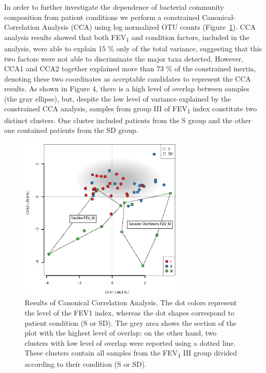 In order to further investigate the dependence of bacterial community composition from patient conditions we perform a constrained Canonical-Correlation Analysis (CCA) using log normalized OTU counts (Figure~\ref{fig:fig416s}). CCA analysis results showed that both FEV\textsubscript{1} and condition factors, included in the analysis, were able to explain 15 \% only of the total variance, suggesting that this two factors were not able to discriminate the major taxa detected. However, CCA1 and CCA2 together explained more than 73 \% of the constrained inertia, denoting these two coordinates as acceptable candidates to represent the CCA results. As shown in Figure 4, there is a high level of overlap between samples (the gray ellipse), but, despite the low level of variance explained by the constrained CCA analysis, samples from group III of FEV\textsubscript{1} index constitute two distinct clusters. One cluster included patients from the S group and the other one contained patients from the SD group.\\%
\begin{figure}[!tb]
	\centering
	\includegraphics[width=0.7\textwidth]{./figures/Chapter_7/Figure_4_16s}
  	\caption{\label{fig:fig416s}Results of Canonical Correlation Analysis. The dot colors represent the level of the FEV1 index, whereas the dot shapes correspond to patient condition (S or SD). The grey area shows the section of the plot with the highest level of overlap; on the other hand, two clusters with low level of overlap were reported using a dotted line. These clusters contain all samples from the FEV\textsubscript{1} III group divided according to their condition (S or SD).}
\end{figure}%


